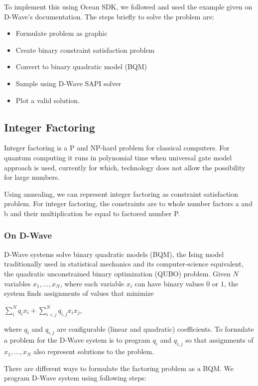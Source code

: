 \documentclass[12pt,conference]{IEEEtran}
\begin{document}
To implement this using Ocean SDK, we followed and used the example given on D-Wave's documentation\cite{7}. The steps briefly to solve the problem are: 

\begin{itemize}
  \item Formulate problem as graphic
  \item Create binary constraint satisfaction problem
  \item Convert to binary quadratic model (BQM)
  \item Sample using D-Wave SAPI solver
  \item Plot a valid solution.
\end{itemize}

\subsection{Integer Factoring}
Integer factoring is a P and NP-hard problem for classical computers. For quantum computing it runs in polynomial time when universal gate model approach is used, currently for which, technology does not allow the possibility for large numbers.

Using annealing, we can represent integer factoring as constraint satisfaction problem. For integer factoring, the constraints are to whole number factors a and b and their multiplication be equal to factored number P.

\subsubsection{On D-Wave}
D-Wave systems solve binary quadratic models (BQM), the Ising model traditionally used in statistical mechanics and its computer-science equivalent, the quadratic unconstrained binary optimization (QUBO) problem. Given $N$ variables $x_1,...,x_N$, where each variable $x_i$ can have binary values $0$ or $1$, the system finds assignments of values that minimize \cite{6}

$\sum_i^N q_ix_i + \sum_{i<j}^N q_{i,j}x_i  x_j$,

where $q_i$ and $q_{i,j}$ are configurable (linear and quadratic) coefficients. To formulate a problem for the D-Wave system is to program $q_i$ and $q_{i,j}$ so that assignments of $x_1,...,x_N$ also represent solutions to the problem.

There are different ways to formulate the factoring problem as a BQM. We program D-Wave system using following steps:
\end{document}
